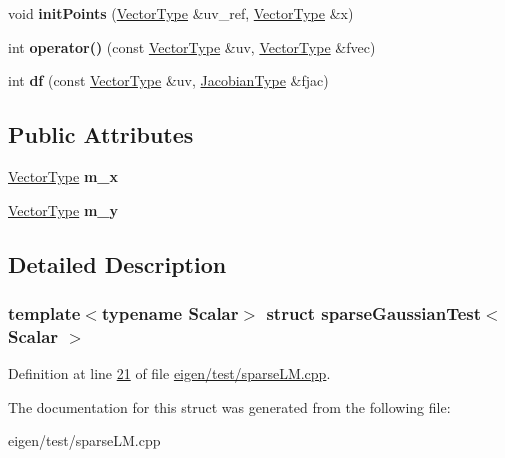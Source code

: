 \begin{DoxyCompactItemize}
\mbox{\label{structsparse_gaussian_test_a964e03cd4e6c6bb25894d0a0f971e9c5}} 
void {\bfseries init\+Points} (\hyperlink{group___core___module}{Vector\+Type} \&uv\+\_\+ref, \hyperlink{group___core___module}{Vector\+Type} \&x)
\item 
\mbox{\label{structsparse_gaussian_test_a20fdf53322777c8d091a41ec126cbf34}} 
int {\bfseries operator()} (const \hyperlink{group___core___module}{Vector\+Type} \&uv, \hyperlink{group___core___module}{Vector\+Type} \&fvec)
\item 
\mbox{\label{structsparse_gaussian_test_a613e13b4e27120473ba6bc74d224aef8}} 
int {\bfseries df} (const \hyperlink{group___core___module}{Vector\+Type} \&uv, \hyperlink{group___sparse_core___module_class_eigen_1_1_sparse_matrix}{Jacobian\+Type} \&fjac)
\end{DoxyCompactItemize}
\subsection*{Public Attributes}
\begin{DoxyCompactItemize}
\item 
\mbox{\label{structsparse_gaussian_test_a8095bfd0a88a24b8f38bf4a08b48e63f}} 
\hyperlink{group___core___module}{Vector\+Type} {\bfseries m\+\_\+x}
\item 
\mbox{\label{structsparse_gaussian_test_a6ebe2519d50a11147e11532ab25ed1e4}} 
\hyperlink{group___core___module}{Vector\+Type} {\bfseries m\+\_\+y}
\end{DoxyCompactItemize}


\subsection{Detailed Description}
\subsubsection*{template$<$typename Scalar$>$\newline
struct sparse\+Gaussian\+Test$<$ Scalar $>$}



Definition at line \hyperlink{eigen_2test_2sparse_l_m_8cpp_source_l00021}{21} of file \hyperlink{eigen_2test_2sparse_l_m_8cpp_source}{eigen/test/sparse\+L\+M.\+cpp}.



The documentation for this struct was generated from the following file\+:\begin{DoxyCompactItemize}
\item 
eigen/test/sparse\+L\+M.\+cpp\end{DoxyCompactItemize}
